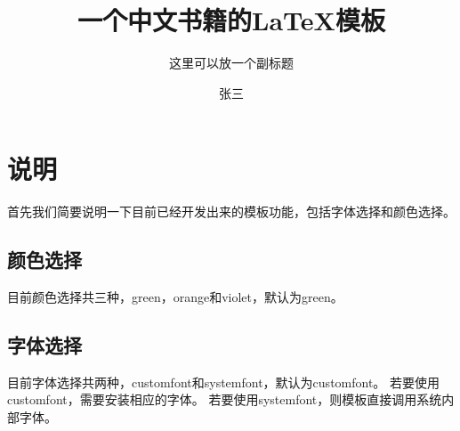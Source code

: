 \documentclass{tjbook}
\title{一个中文书籍的\LaTeX{}模板}
\subtitle{这里可以放一个副标题}
\author{张三}%
\begin{document}
\maketitle
\makeflypage
\frontmatter
\tableofcontents

\mainmatter
\chapter{说明}
首先我们简要说明一下目前已经开发出来的模板功能，包括字体选择和颜色选择。
\section{颜色选择}
目前颜色选择共三种，green，orange和violet，默认为green。
\section{字体选择}
目前字体选择共两种，customfont和systemfont，默认为customfont。
若要使用customfont，需要安装相应的字体。
若要使用systemfont，则模板直接调用系统内部字体。
\makebackcover
\end{document}
